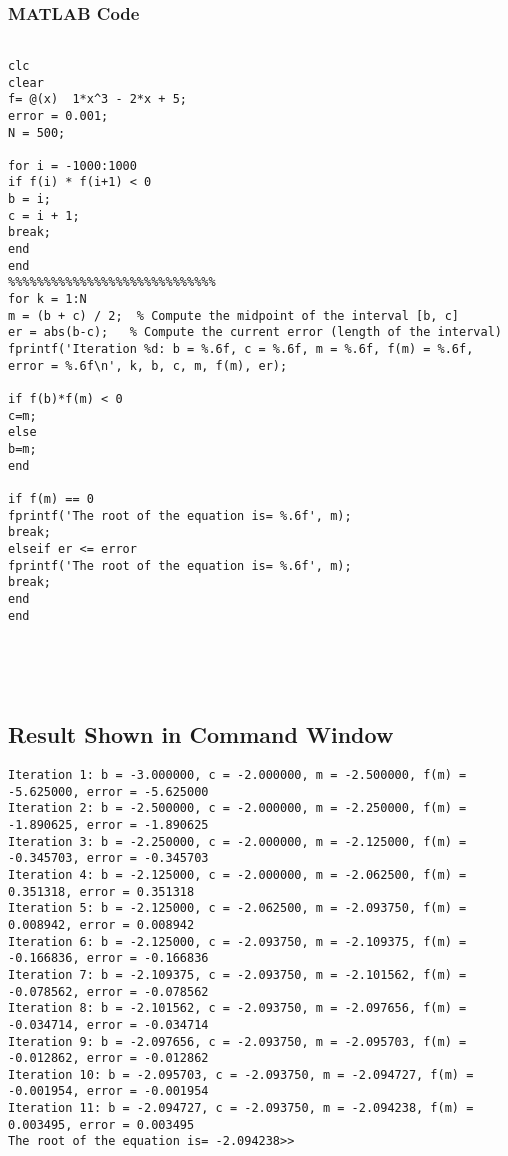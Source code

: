 \documentclass[a4paper,12pt]{article}
\begin{document}
	
	\subsubsection*{MATLAB Code}
	\begin{lstlisting}[style=vscode-light, caption={Solving Non-linear Equation Using Bisection Method in MATLAB.} ]
		
clc
clear
f= @(x)  1*x^3 - 2*x + 5;
error = 0.001;
N = 500;

for i = -1000:1000
if f(i) * f(i+1) < 0
b = i;
c = i + 1;
break;
end
end
%%%%%%%%%%%%%%%%%%%%%%%%%%%%%
for k = 1:N
m = (b + c) / 2;  % Compute the midpoint of the interval [b, c]
er = abs(b-c);   % Compute the current error (length of the interval)
fprintf('Iteration %d: b = %.6f, c = %.6f, m = %.6f, f(m) = %.6f, error = %.6f\n', k, b, c, m, f(m), er);

if f(b)*f(m) < 0
c=m;
else
b=m;
end

if f(m) == 0
fprintf('The root of the equation is= %.6f', m);
break;
elseif er <= error
fprintf('The root of the equation is= %.6f', m);
break;
end
end


	
		
	\end{lstlisting}
	

	
	\newpage
	\subsection{Result Shown in Command Window}

\begin{lstlisting}[style=vscode-light, caption={Command Window} ]
Iteration 1: b = -3.000000, c = -2.000000, m = -2.500000, f(m) = -5.625000, error = -5.625000
Iteration 2: b = -2.500000, c = -2.000000, m = -2.250000, f(m) = -1.890625, error = -1.890625
Iteration 3: b = -2.250000, c = -2.000000, m = -2.125000, f(m) = -0.345703, error = -0.345703
Iteration 4: b = -2.125000, c = -2.000000, m = -2.062500, f(m) = 0.351318, error = 0.351318
Iteration 5: b = -2.125000, c = -2.062500, m = -2.093750, f(m) = 0.008942, error = 0.008942
Iteration 6: b = -2.125000, c = -2.093750, m = -2.109375, f(m) = -0.166836, error = -0.166836
Iteration 7: b = -2.109375, c = -2.093750, m = -2.101562, f(m) = -0.078562, error = -0.078562
Iteration 8: b = -2.101562, c = -2.093750, m = -2.097656, f(m) = -0.034714, error = -0.034714
Iteration 9: b = -2.097656, c = -2.093750, m = -2.095703, f(m) = -0.012862, error = -0.012862
Iteration 10: b = -2.095703, c = -2.093750, m = -2.094727, f(m) = -0.001954, error = -0.001954
Iteration 11: b = -2.094727, c = -2.093750, m = -2.094238, f(m) = 0.003495, error = 0.003495
The root of the equation is= -2.094238>> 
	
	
\end{lstlisting}
\end{document}
